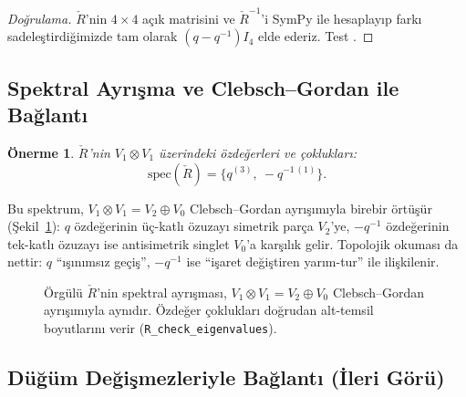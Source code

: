 \documentclass[10pt]{math}
\numberwithin{equation}{section}
\theoremstyle{plain}
\newtheorem{proposition}[theorem]{Önerme}
\theoremstyle{definition}
\newcommand{\Rcheck}{\check{R}}
\begin{document}
\begin{proof}[Doğrulama]
$\check R$'nin $4 \times 4$ açık matrisini ve $\check R^{-1}$'i SymPy
ile hesaplayıp farkı sadeleştirdiğimizde tam olarak
$(q - q^{-1}) I_4$ elde ederiz. Test
.
\end{proof}

\subsection{Spektral Ayrışma ve Clebsch--Gordan ile Bağlantı}

\begin{proposition}\label{prop:eigs}
$\check R$'nin $V_1 \otimes V_1$ üzerindeki özdeğerleri ve çoklukları:
\[
  \mathrm{spec}(\check R) = \{q^{(3)},\ -q^{-1\,(1)}\}.
\]
\end{proposition}

Bu spektrum, $V_1 \otimes V_1 = V_2 \oplus V_0$ Clebsch--Gordan ayrışımıyla
birebir örtüşür (Şekil~\ref{fig:spec}): $q$ özdeğerinin üç-katlı özuzayı simetrik
parça $V_2$'ye, $-q^{-1}$ özdeğerinin tek-katlı özuzayı ise antisimetrik singlet
$V_0$'a karşılık gelir. Topolojik okuması da nettir: $q$ ``ışınımsız geçiş'',
$-q^{-1}$ ise ``işaret değiştiren yarım-tur'' ile ilişkilenir.

\begin{figure}[h]
\centering
{}
\caption{Örgülü $\Rcheck$'nin spektral ayrışması, $V_1\otimes V_1=V_2\oplus V_0$
Clebsch--Gordan ayrışımıyla aynıdır. Özdeğer çoklukları doğrudan alt-temsil
boyutlarını verir (\texttt{R\_check\_eigenvalues}).}
\label{fig:spec}
\end{figure}

\subsection{Düğüm Değişmezleriyle Bağlantı (İleri Görü)}
\end{document}
